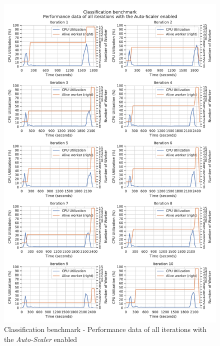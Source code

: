 \begin{figure}[h]
\centering
\includegraphics[scale=0.5]{images/appendix/evaluation_data/classification_benchmark/classification_auto-scaler_performance}
\caption{Classification benchmark - Performance data of all iterations with the \textit{Auto-Scaler} enabled}
\label{fig:appendix_eval_classification_auto-scaler}
\end{figure}

